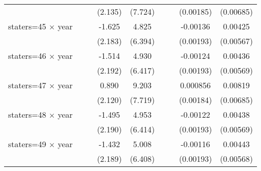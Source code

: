 {\begin{longtable}{l*{8}{c}}
                    &                     &                     &     (2.135)         &     (7.724)         &                     &                     &   (0.00185)         &   (0.00685)         \\
[1em]
staters=45 $\times$ year&                     &                     &      -1.625         &       4.825         &                     &                     &    -0.00136         &     0.00425         \\
                    &                     &                     &     (2.183)         &     (6.394)         &                     &                     &   (0.00193)         &   (0.00567)         \\
[1em]
staters=46 $\times$ year&                     &                     &      -1.514         &       4.930         &                     &                     &    -0.00124         &     0.00436         \\
                    &                     &                     &     (2.192)         &     (6.417)         &                     &                     &   (0.00193)         &   (0.00569)         \\
[1em]
staters=47 $\times$ year&                     &                     &       0.890         &       9.203         &                     &                     &    0.000856         &     0.00819         \\
                    &                     &                     &     (2.120)         &     (7.719)         &                     &                     &   (0.00184)         &   (0.00685)         \\
[1em]
staters=48 $\times$ year&                     &                     &      -1.495         &       4.953         &                     &                     &    -0.00122         &     0.00438         \\
                    &                     &                     &     (2.190)         &     (6.414)         &                     &                     &   (0.00193)         &   (0.00569)         \\
[1em]
staters=49 $\times$ year&                     &                     &      -1.432         &       5.008         &                     &                     &    -0.00116         &     0.00443         \\
                    &                     &                     &     (2.189)         &     (6.408)         &                     &                     &   (0.00193)         &   (0.00568)         \\

\end{longtable}}
